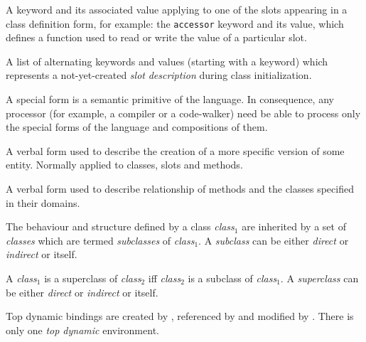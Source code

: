 \begin{optDefinition}
\begin{definitions}
      A keyword and its
    associated value applying to one of the slots appearing in a class
    definition form, for example: the {\tt accessor} keyword and its
    value, which defines a function used to read or write the value of a
    particular slot.

      A list
    of alternating keywords and values (starting with a keyword) which
    represents a not-yet-created {\em slot} {\em description} during class
    initialization.

      A special form is a
    semantic primitive of the language.  In consequence, any processor (for
    example, a compiler or a code-walker) need be able to process only the
    special forms of the language and compositions of them.

     A verbal form used to
    describe the creation of a more specific version of some entity.  Normally
    applied to classes, slots and methods.

     A verbal form used
    to describe relationship of methods and the classes specified in their
    domains.

      The behaviour and structure
    defined by a class {\em class$_1$} are inherited by a set of {\em classes}
    which are termed {\em subclasses} of {\em class$_1$}.  A {\em subclass} can
    be either {\em direct} or {\em indirect} or itself.

      A {\em class$_1$} is a
    superclass of {\em class$_2$} iff {\em class$_2$} is a subclass of {\em
        class$_1$}.  A {\em superclass} can be either {\em direct} or {\em
        indirect} or itself.


     Top dynamic bindings
    are created by , referenced by 
    and modified by .  There is only one {\em top
        dynamic} environment.


\end{definitions}
\end{optDefinition}

